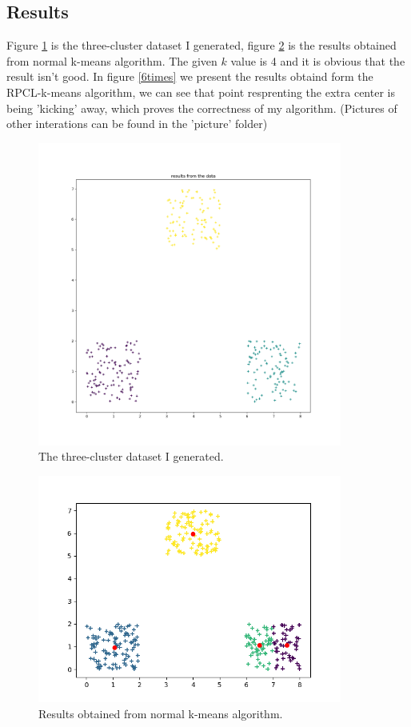 \documentclass{article}
\theoremstyle{definition}
\numberwithin{equation}{section}
\numberwithin{figure}{section}
\begin{document}
\subsection{Results}
Figure \ref{data} is the three-cluster dataset I generated, figure \ref{normal} is the results obtained from normal k-means algorithm. The given $k$ value is 4 and it is obvious that the result isn't good. In figure \ref{6times} we present the results obtaind form the RPCL-k-means algorithm, we can see that point resprenting the extra center is being 'kicking' away, which proves the correctness of my algorithm. (Pictures of other interations can be found in the 'picture' folder)
\begin{figure}[htbp]
	\centering
	\includegraphics[width=10cm]{problem2/data.png}
\caption{The three-cluster dataset I generated.}
\label{data}
\end{figure}

\begin{figure}[htbp]
	\centering
	\includegraphics[width=10cm]{problem2/normal_k_means.png}
\caption{Results obtained from normal k-means algorithm.}
\label{normal}
\end{figure}
\end{document}

